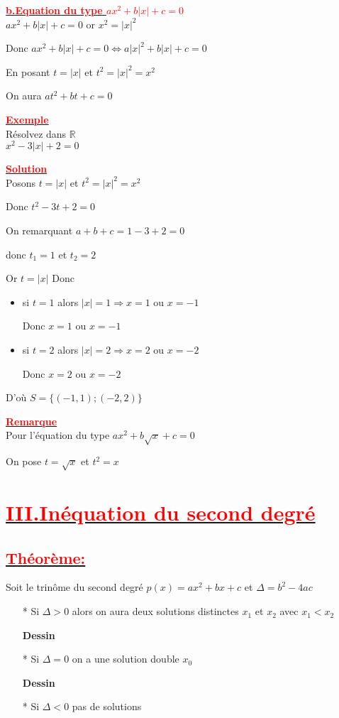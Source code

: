 \documentclass[12pt]{article}
\begin{document}
\underline{\textbf{\textcolor{red}{b.Equation du type $ax^{2}+b|x|+c=0$}}}\\
$ax^{2}+b|x|+c=0$ or $x^{2}=|x|^{2}$

Donc $ax^{2}+b|x|+c=0 \Leftrightarrow a|x|^{2}+b|x|+c=0$

En posant $t=|x|$ et $t^{2}=|x|^{2}=x^{2}$

On aura $at^{2}+bt+c=0$

\underline{\textbf{\textcolor{red}{Exemple}}}\\
Résolvez dans $\mathbb{R}$\\
$x^{2}-3|x|+2=0$

\underline{\textbf{\textcolor{red}{Solution}}}\\
Posons $t=|x|$ et $t^{2}=|x|^{2}=x^{2}$

Donc $t^{2}-3t+2=0$

On remarquant $a+b+c=1-3+2=0$ 

donc $t_{1}=1$ et $t_{2}=2$

Or $t=|x|$  Donc
\begin{itemize}
\item si $t=1$ alors $|x|=1 \Rightarrow x=1$ ou 
$x=-1$

Donc $x=1$ ou $x=-1$
\item si $t=2$ alors $|x|=2 \Rightarrow x=2$ ou 
$x=-2$

Donc $x=2$ ou $x=-2$
\end{itemize}
D'où $S=\lbrace(-1, 1);(-2, 2) \rbrace$

\underline{\textbf{\textcolor{red}{Remarque}}}\\
Pour l'équation du type $ax^{2}+b\sqrt{x}+c=0$

On pose $t=\sqrt{x}$ et $t^{2}=x$
\section*{\underline{\textbf{\textcolor{red}{III.Inéquation du second degré}}}}
\subsection*{\underline{\textbf{\textcolor{red}{Théorème:}}}}
Soit le trinôme du second degré $p(x)=ax^{2}+bx+c$ et $\Delta=b^{2}-4ac$
\begin{itemize}
\item[*] Si $\Delta >0$ alors on aura deux solutions distinctes $x_{1}$ et $x_{2}$ avec $x_{1} < x_{2}$

\textbf{Dessin}

\item[*] Si $\Delta =0$ on a une solution double $x_{0}$

\textbf{Dessin}

\item[*] Si $\Delta <0$ pas de solutions
\end{itemize}
\end{document}
